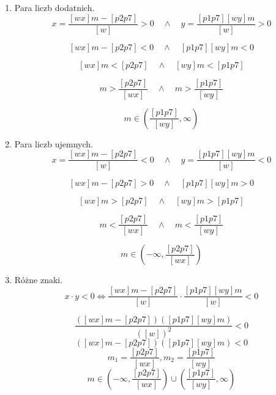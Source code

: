 \documentclass[12pt, a4paper]{article}
\theoremstyle{definition} %
\theoremstyle{definition} %
\begin{document}
\begin{enumerate}
    \item Para liczb dodatnich.
    $$x=\frac{[wx]m-[p2p7]}{[w]}>0\quad \land \quad  y=\frac{[p1p7][wy]m}{[w]}>0$$
    
    $$[wx]m-[p2p7]<0 \quad \land \quad [p1p7][wy]m<0$$
    
    $$[wx]m<[p2p7] \quad \land \quad [wy]m<[p1p7]$$
    
    $$m>\frac{[p2p7]}{[wx]} \quad \land \quad m>\frac{[p1p7]}{[wy]}$$
    
    $$m\in\left(\frac{[p1p7]}{[wy]} ,\infty\right)$$
    
    \item Para liczb ujemnych.
    $$x=\frac{[wx]m-[p2p7]}{[w]}<0\quad \land \quad  y=\frac{[p1p7][wy]m}{[w]}<0$$
    
    $$[wx]m-[p2p7]>0 \quad \land \quad [p1p7][wy]m>0$$
    
     $$[wx]m>[p2p7] \quad \land \quad [wy]m>[p1p7]$$
     
      $$m<\frac{[p2p7]}{[wx]} \quad \land \quad m<\frac{[p1p7]}{[wy]}$$
      
       $$m\in\left(-\infty,\frac{[p2p7]}{[wx]} \right) $$
      
      \item Różne znaki.
      $$x\cdot y <0 \iff \frac{[wx]m-[p2p7]}{[w]} \cdot \frac{[p1p7][wy]m}{[w]}<0$$
      
      $$\frac{([wx]m-[p2p7])([p1p7][wy]m)}{([w])^{2}}<0 $$
      $$([wx]m-[p2p7])([p1p7][wy]m)<0$$
      $$m_{1}=\frac{[p2p7]}{[wx]}, m_{2}=\frac{[p1p7]}{[wy]} $$
      $$m\in\left(-\infty,\frac{[p2p7]}{[wx]} \right) \cup \left(\frac{[p1p7]}{[wy]}  ,\infty\right)$$
    
\end{enumerate}
\end{document}
